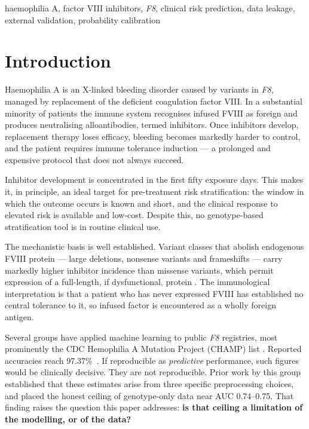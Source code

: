 \documentclass[conference]{IEEEtran}
\begin{document}
\begin{IEEEkeywords}
haemophilia A, factor VIII inhibitors, \textit{F8}, clinical risk prediction,
data leakage, external validation, probability calibration
\end{IEEEkeywords}

\section{Introduction}

Haemophilia A is an X-linked bleeding disorder caused by variants in
\textit{F8}, managed by replacement of the deficient coagulation factor VIII.
In a substantial minority of patients the immune system recognises infused
FVIII as foreign and produces neutralising alloantibodies, termed inhibitors.
Once inhibitors develop, replacement therapy loses efficacy, bleeding becomes
markedly harder to control, and the patient requires immune tolerance
induction --- a prolonged and expensive protocol that does not always succeed.

Inhibitor development is concentrated in the first fifty exposure days. This
makes it, in principle, an ideal target for pre-treatment risk stratification:
the window in which the outcome occurs is known and short, and the clinical
response to elevated risk is available and low-cost. Despite this, no
genotype-based stratification tool is in routine clinical use.

The mechanistic basis is well established. Variant classes that abolish
endogenous FVIII protein --- large deletions, nonsense variants and
frameshifts --- carry markedly higher inhibitor incidence than missense
variants, which permit expression of a full-length, if dysfunctional, protein
\cite{gouw}. The immunological interpretation is that a patient who has never
expressed FVIII has established no central tolerance to it, so infused factor
is encountered as a wholly foreign antigen.

Several groups have applied machine learning to public \textit{F8} registries,
most prominently the CDC Hemophilia A Mutation Project (CHAMP) list
\cite{champ}. Reported accuracies reach 97.37\%~\cite{singh}. If reproducible
as \textit{predictive} performance, such figures would be clinically decisive.
They are not reproducible. Prior work by this group established that these
estimates arise from three specific preprocessing choices, and placed the
honest ceiling of genotype-only data near AUC 0.74--0.75. That finding raises
the question this paper addresses: \textbf{is that ceiling a limitation of the
modelling, or of the data?}
\end{document}
